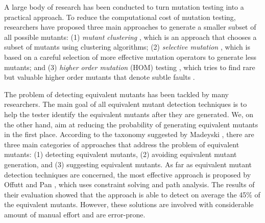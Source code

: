 A large body of research has been conducted to turn mutation testing into a practical approach.
To reduce the computational cost of  mutation testing, researchers have
proposed three main approaches to generate a smaller subset of all possible mutants: 
(1) \emph{mutant clustering} \cite{ji:seke09}, which is an approach that chooses a subset of
mutants using clustering algorithms; (2)  \emph{selective mutation} \cite{barbosa:stvr01, siami:icse08, zhang:icse10}, which is based on a  
careful selection of more effective mutation operators to generate less mutants; and 
 (3) \emph{higher order mutation} (HOM) testing \cite{jia:scam08}, which tries to find 
rare but valuable higher order mutants that denote subtle faults \cite{jia:tse10}.   

The problem of detecting equivalent mutants has been tackled by many researchers. The main goal of all equivalent mutant detection techniques is to help the tester identify the equivalent mutants after they are generated. We, on the other hand, aim at reducing the probability of generating equivalent mutants in the first place.
According to the taxonomy suggested by Madeyski \etal \cite{madeyski:tse13}, there are three main categories of approaches that address the problem of equivalent mutants: (1) detecting equivalent mutants, (2) avoiding equivalent mutant generation, and (3) suggesting equivalent mutants. As far as equivalent mutant detection techniques are concerned, 
the most effective approach is proposed by
Offutt and Pan \cite{offutt:tvr97, offutt:compass96}, which uses constraint
solving and path analysis. The results of their evaluation showed that the approach is able to detect on average the 45\% of the equivalent mutants. 
However, these solutions are involved with considerable amount of manual effort and are error-prone.

